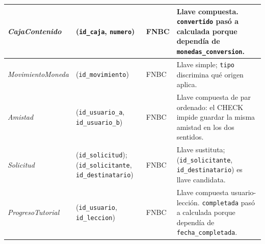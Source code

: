 \begin{center}
\begin{longtable}{|L{0.19\textwidth}|L{0.23\textwidth}|L{0.08\textwidth}|L{0.38\textwidth}|}
\textit{Caja\-Contenido} & (\texttt{id\_\allowbreak{}caja}, \texttt{numero}) & FNBC & Llave compuesta. \texttt{convertido} pasó a calculada porque dependía de \texttt{monedas\_\allowbreak{}conversion}. \\ \hline
\textit{Movimiento\-Moneda} & (\texttt{id\_\allowbreak{}movimiento}) & FNBC & Llave simple; \texttt{tipo} discrimina qué origen aplica. \\ \hline
\textit{Amistad} & (\texttt{id\_\allowbreak{}usuario\_\allowbreak{}a}, \texttt{id\_\allowbreak{}usuario\_\allowbreak{}b}) & FNBC & Llave compuesta de par ordenado: el CHECK impide guardar la misma amistad en los dos sentidos. \\ \hline
\textit{Solicitud} & (\texttt{id\_\allowbreak{}solicitud}); (\texttt{id\_\allowbreak{}solicitante}, \texttt{id\_\allowbreak{}destinatario}) & FNBC & Llave sustituta; (\texttt{id\_\allowbreak{}solicitante}, \texttt{id\_\allowbreak{}destinatario}) es llave candidata. \\ \hline
\textit{Progreso\-Tutorial} & (\texttt{id\_\allowbreak{}usuario}, \texttt{id\_\allowbreak{}leccion}) & FNBC & Llave compuesta usuario-lección. \texttt{completada} pasó a calculada porque dependía de \texttt{fecha\_\allowbreak{}completada}. \\ \hline
\end{longtable}
\end{center}
